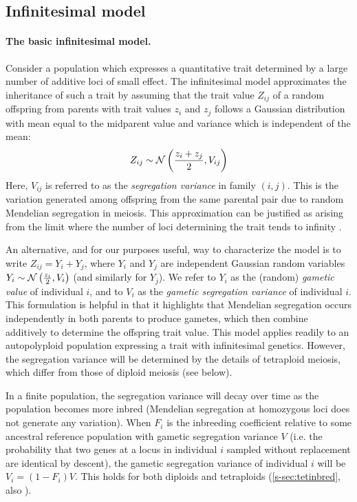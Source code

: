 \documentclass[12pt,a4paper]{article}
\begin{document}
    \subsection*{Infinitesimal model}

    \paragraph*{The basic infinitesimal model.}

    Consider a population which expresses a quantitative trait determined by a
    large number of additive loci of small effect.
    The infinitesimal model approximates the inheritance of such a trait by
    assuming that the trait value $Z_{ij}$ of a random offspring from parents with
    trait values $z_i$ and $z_j$ follows a Gaussian distribution with mean equal to
    the midparent value and variance which is independent of the mean:
      \begin{align}
      Z_{ij} \sim \mathcal{N}\left(\frac{z_i + z_j}{2}, V_{ij}\right)
      \label{eq:inf}
      \end{align}
    Here, $V_{ij}$ is referred to as the \textit{segregation variance} in family
    $(i,j)$.
    This is the variation generated among offspring from the same parental pair due
    to random Mendelian segregation in meiosis.
    This approximation can be justified as arising from the limit where the number
    of loci determining the trait tends to infinity \citep{barton2017}.

    An alternative, and for our purposes useful, way to characterize the model
    is to write $Z_{ij} = Y_i + Y_j$, where $Y_i$ and $Y_j$
    are independent Gaussian random variables $Y_i \sim \mathcal{N}\left(\frac{z_i}{2},
    V_i\right)$ (and similarly for $Y_j$).
    We refer to $Y_i$ as the (random) \textit{gametic value} of individual $i$, and
    to $V_i$ as the \textit{gametic segregation variance} of individual $i$.
    This formulation is helpful in that it highlights that Mendelian segregation
    occurs independently in both parents to produce gametes, which then combine
    additively to determine the offspring trait value.
    This model applies readily to an autopolyploid population expressing a trait
    with infinitesimal genetics.
    However, the segregation variance will be determined by the details of
    tetraploid meiosis, which differ from those of diploid meiosis (see below).

    In a finite population, the segregation variance will decay over time as the
    population becomes more inbred (Mendelian segregation at homozygous loci does
    not generate any variation).
    When $F_i$ is the inbreeding coefficient relative to some ancestral reference
    population with gametic segregation variance $V$ (i.e. the probability that two
    genes at a locus in individual $i$ sampled without replacement are identical by
    descent), the gametic segregation variance of individual $i$ will be
    $V_i = (1-F_i)V$.
    This holds for both diploids and tetraploids (\cref{s-sec:tetinbred}, also
    \cite{moody1993}). 
\end{document}
